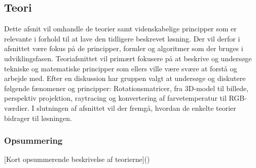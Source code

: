 \subsection{Teori}

Dette afsnit vil omhandle de teorier samt videnskabelige principper som er relevante i forhold til at lave den tidligere beskrevet løsning. Der vil derfor i afsnittet være fokus på de principper, formler og algoritmer som der bruges i udviklingsfasen. Teoriafsnittet vil primært fokusere på at beskrive og undersøge tekniske og matematiske principper som ellers ville være svære at forstå og arbejde med. Efter en diskussion har gruppen valgt at undersøge og diskutere følgende fænomener og principper: Rotationsmatricer, fra 3D-model til billede, perspektiv projektion, raytracing og konvertering af farvetemperatur til RGB-værdier. I slutningen af afsnittet vil der fremgå, hvordan de enkelte teorier bidrager til løsningen.







\subsubsection*{Opsummering}

[Kort opsummerende beskrivelse af teorierne]()
